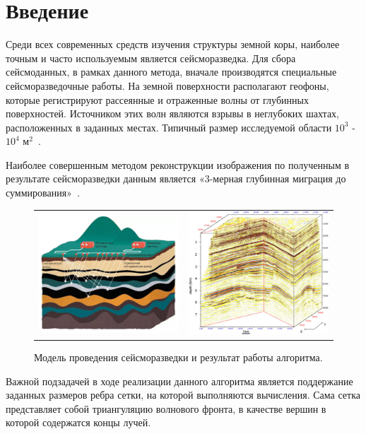 \documentclass[12pt, cleqn, a4paper]{article}
\newcommand{\anonsection}[1]{\section*{#1}\addcontentsline{toc}{section}{#1}}
\begin{document}
\newpage
\anonsection{Введение}
Среди всех современных средств изучения структуры земной коры, наиболее точным и часто используемым является сейсморазведка. Для сбора сейсмоданных, в рамках данного метода, вначале производятся специальные сейсморазведочные работы. На земной поверхности располагают геофоны, которые регистрируют рассеянные и отраженные волны от глубинных поверхностей. Источником этих волн являются взрывы в неглубоких шахтах, расположенных в заданных местах. Типичный размер исследуемой области $10^3$ - $10^4$ $\text{м}^2$~\cite{kirchhoff}.

Наиболее совершенным методом реконструкции изображения по полученным в результате сейсморазведки данным является «3-мерная глубинная миграция до
суммирования»~\cite{kirchhoff, multiarrival, thomsen1986weak}.

\begin{figure}[H]
    \centering
    \begin{tabular}{cc}
    \includegraphics[width=0.5\linewidth]{model_seismic_survey.eps}
    &
    \includegraphics[width=0.4\linewidth]{seismic_image.eps}
    \end{tabular}
    \caption{Модель проведения сейсморазведки и результат работы алгоритма.}
\end{figure}

Важной подзадачей в ходе реализации данного алгоритма является поддержание заданных размеров ребра сетки, на которой выполняются вычисления. Сама сетка представляет собой триангуляцию волнового фронта, в качестве вершин в которой содержатся концы лучей. 
\end{document}
